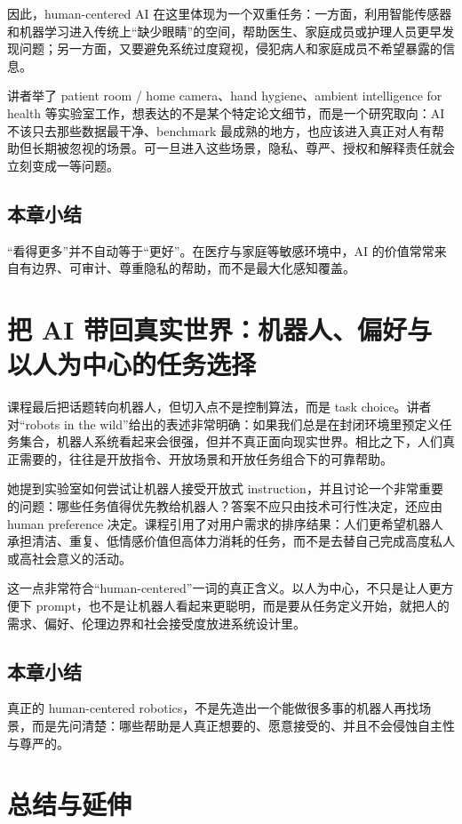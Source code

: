 \documentclass[a4paper]{article}
\begin{document}
因此，human-centered AI 在这里体现为一个双重任务：一方面，利用智能传感器和机器学习进入传统上“缺少眼睛”的空间，帮助医生、家庭成员或护理人员更早发现问题；另一方面，又要避免系统过度窥视，侵犯病人和家庭成员不希望暴露的信息。

讲者举了 patient room / home camera、hand hygiene、ambient intelligence for health 等实验室工作，想表达的不是某个特定论文细节，而是一个研究取向：AI 不该只去那些数据最干净、benchmark 最成熟的地方，也应该进入真正对人有帮助但长期被忽视的场景。可一旦进入这些场景，隐私、尊严、授权和解释责任就会立刻变成一等问题。

\subsection{本章小结}

“看得更多”并不自动等于“更好”。在医疗与家庭等敏感环境中，AI 的价值常常来自有边界、可审计、尊重隐私的帮助，而不是最大化感知覆盖。

\section{把 AI 带回真实世界：机器人、偏好与以人为中心的任务选择}

课程最后把话题转向机器人，但切入点不是控制算法，而是 task choice。讲者对“robots in the wild”给出的表述非常明确：如果我们总是在封闭环境里预定义任务集合，机器人系统看起来会很强，但并不真正面向现实世界。相比之下，人们真正需要的，往往是开放指令、开放场景和开放任务组合下的可靠帮助。

她提到实验室如何尝试让机器人接受开放式 instruction，并且讨论一个非常重要的问题：哪些任务值得优先教给机器人？答案不应只由技术可行性决定，还应由 human preference 决定。课程引用了对用户需求的排序结果：人们更希望机器人承担清洁、重复、低情感价值但高体力消耗的任务，而不是去替自己完成高度私人或高社会意义的活动。

这一点非常符合“human-centered”一词的真正含义。以人为中心，不只是让人更方便下 prompt，也不是让机器人看起来更聪明，而是要从任务定义开始，就把人的需求、偏好、伦理边界和社会接受度放进系统设计里。

\subsection{本章小结}

真正的 human-centered robotics，不是先造出一个能做很多事的机器人再找场景，而是先问清楚：哪些帮助是人真正想要的、愿意接受的、并且不会侵蚀自主性与尊严的。

\section{总结与延伸}
\end{document}
